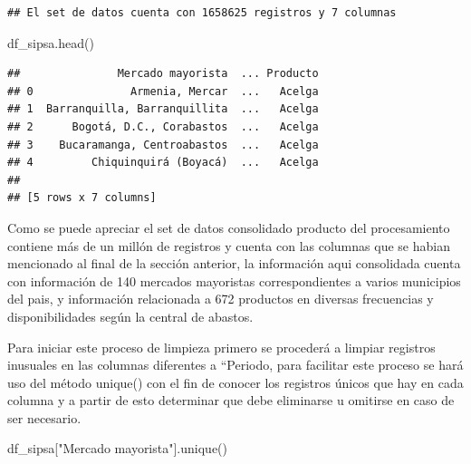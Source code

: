 \documentclass[
]{book}
\newenvironment{Shaded}{\begin{snugshade}}{\end{snugshade}}
\newcommand{\NormalTok}[1]{#1}
\newcommand{\StringTok}[1]{\textcolor[rgb]{0.31,0.60,0.02}{#1}}
\begin{document}
\begin{verbatim}
## El set de datos cuenta con 1658625 registros y 7 columnas
\end{verbatim}

\begin{Shaded}
\begin{Highlighting}[]
\NormalTok{df\_sipsa.head()}
\end{Highlighting}
\end{Shaded}

\begin{verbatim}
##               Mercado mayorista  ... Producto
## 0               Armenia, Mercar  ...   Acelga
## 1  Barranquilla, Barranquillita  ...   Acelga
## 2      Bogotá, D.C., Corabastos  ...   Acelga
## 3    Bucaramanga, Centroabastos  ...   Acelga
## 4         Chiquinquirá (Boyacá)  ...   Acelga
## 
## [5 rows x 7 columns]
\end{verbatim}

Como se puede apreciar el set de datos consolidado producto del procesamiento contiene más de un millón de registros y cuenta con las columnas que se habian mencionado al final de la sección anterior, la información aqui consolidada cuenta con información de 140 mercados mayoristas correspondientes a varios municipios del pais, y información relacionada a 672 productos en diversas frecuencias y disponibilidades según la central de abastos.

Para iniciar este proceso de limpieza primero se procederá a limpiar registros inusuales en las columnas diferentes a ``Periodo, para facilitar este proceso se hará uso del método unique() con el fin de conocer los registros únicos que hay en cada columna y a partir de esto determinar que debe eliminarse u omitirse en caso de ser necesario.

\begin{Shaded}
\begin{Highlighting}[]

\NormalTok{df\_sipsa[}\StringTok{"Mercado mayorista"}\NormalTok{].unique()}
\end{Highlighting}
\end{Shaded}
\end{document}
